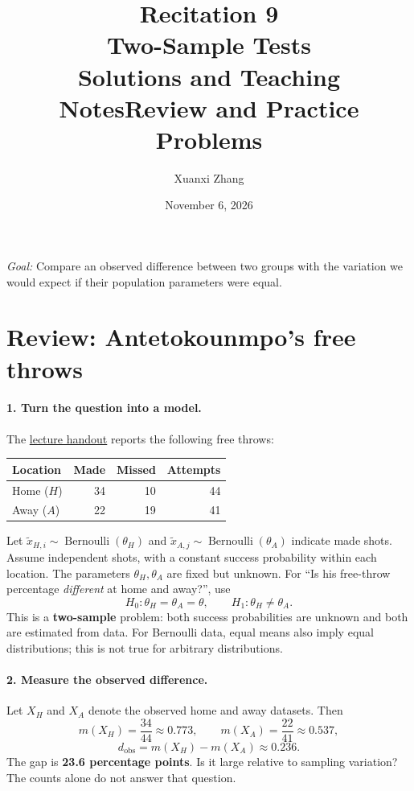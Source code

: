 \documentclass[11pt]{article}
\title{\huge Recitation 9\\[0.35em]\normalsize Two-Sample Tests\\[0.35em]
 \large\ifsolutions Solutions and Teaching Notes\else Review and Practice Problems\fi}
\author{Xuanxi Zhang}
\date{November 6, 2026}
\newcommand{\rv}[1]{\widetilde{#1}}
\begin{document}
\maketitle
\noindent\textit{Goal:} Compare an observed difference between two groups with
the variation we would expect if their population parameters were equal.

\section*{Review: Antetokounmpo's free throws}
\paragraph{1. Turn the question into a model.}
The \href{https://github.com/cfgranda/ps4ds/blob/main/slides/hypothesis\%20testing/two_sample_tests_handout.pdf}{lecture handout} reports the following free throws:
\begin{center}
\begin{tabular}{@{}lrrr@{}}
\toprule Location & Made & Missed & Attempts\\\midrule
Home ($H$) & 34 & 10 & 44\\
Away ($A$) & 22 & 19 & 41\\\bottomrule
\end{tabular}
\end{center}
Let $\rv{x}_{H,i}\sim\operatorname{Bernoulli}(\theta_H)$ and
$\rv{x}_{A,j}\sim\operatorname{Bernoulli}(\theta_A)$ indicate made shots.
Assume independent shots, with a constant success probability within each
location. The parameters $\theta_H,\theta_A$ are fixed but unknown.
For ``Is his free-throw percentage \emph{different} at home and away?'', use
\[
 H_0:\theta_H=\theta_A=\theta,\qquad
 H_1:\theta_H\ne\theta_A.
\]
This is a \textbf{two-sample} problem: both success probabilities are unknown
and both are estimated from data. For Bernoulli data, equal means also imply
equal distributions; this is not true for arbitrary distributions.

\paragraph{2. Measure the observed difference.}
Let $X_H$ and $X_A$ denote the observed home and away datasets. Then
\[
 m(X_H)=\frac{34}{44}\approx0.773,\qquad
 m(X_A)=\frac{22}{41}\approx0.537,
\]
\[
 d_{\mathrm{obs}}=m(X_H)-m(X_A)\approx0.236.
\]
The gap is \textbf{23.6 percentage points}. Is it large relative to sampling
variation? The counts alone do not answer that question.
\end{document}
